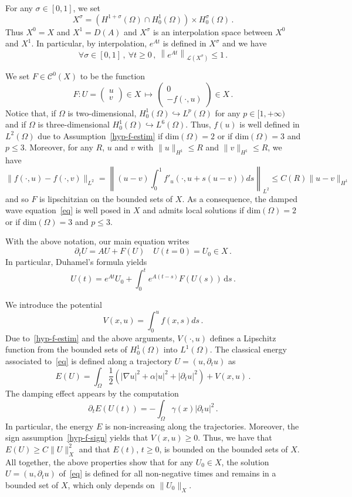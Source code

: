 \documentclass[10pt]{amsart}
\theoremstyle{definition}\newtheorem{defi}[theo]{Definition}\newtheorem{rema}[theo]{Remark}\newtheorem{exam}[theo]{Example}\newtheorem{exem}[theo]{Example}\newtheorem{nota}[theo]{Notation}
\newcommand{\Cc}{\mathcal{C}}
\newcommand{\Lc}{\mathcal{L}}
\newcommand{\drm}{\mathrm{d}}
\newcommand{\grad}{\nabla}
\newcommand{\vect}[2]{\left(
\begin{matrix} #1 \\ #2
\end{matrix}\right)}
\let\oldforall\forall
\renewcommand*{\forall}{\mathrel{\oldforall}}
\begin{document}
For any $\sigma\in [0,1]$, we set
\[
X^\sigma=\left(H^{1+\sigma}(\Omega)\cap H^1_0(\Omega)\right)\times
H^\sigma_0(\Omega)\,.
\]
Thus $X^0=X$ and $X^1=D(A)$ and $X^\sigma$ is an interpolation space between $X^0$ and $X^1$. In particular, by interpolation, $e^{At}$ is defined in $X^\sigma$ and we have
\begin{equation}\label{eq-bound-semigroup}
\forall \sigma\in [0,1]\,,\:\forall t\geq 0\,,\:
\left\|e^{At}\right\|_{\Lc(X^\sigma)}\leq 1\,.
\end{equation}

We set $F\in\Cc^0(X)$ to be the function
\begin{equation}\label{def-F}
F:U=\vect uv \in X\,\longmapsto\,\vect 0 {-f(\cdot,u)} \in X\,.
\end{equation}
Notice that, if $\Omega$ is two-dimensional, $H^1_0(\Omega) \hookrightarrow L^{p}(\Omega)$ for any $p\in[1,+\infty)$ and if $\Omega$ is three-dimensional $H^1_0(\Omega) \hookrightarrow L^6(\Omega)$. Thus, $f(u)$ is well defined in $L^2(\Omega)$ due to Assumption~\eqref{hyp-f-estim} if dim$(\Omega)=2$ or if dim$(\Omega)=3$ and $p\leq 3$. Moreover, for any $R$, $u$ and $v$ with $\|u\|_{H^1}\leq R$ and $\|v\|_{H^1}\leq R$, we have
\[
\|f(\cdot,u)-f(\cdot,v)\|_{L^2}=\left\|(u-v)\int_0^1
f'_u(\cdot,u+s(u-v))ds\right\|_{L^2}
\leq C(R)\|u-v\|_{H^1}
\]
and so $F$ is lipschitzian on the bounded sets of $X$. As a consequence, the damped wave equation~\eqref{eq} is well posed in $X$ and admits local solutions if dim$(\Omega)=2$ or if dim$(\Omega)=3$ and $p\leq 3$.

With the above notation, our main equation writes
\begin{equation}\label{eq2}
\partial_t U=AU + F(U)\quad U(t=0)=U_0\in X\,.
\end{equation}
In particular, Duhamel's formula yields
\[
U(t)=e^{At}U_0 + \int_0^t e^{A(t-s)}F(U(s))\,\drm s\,.
\]

We introduce the potential
\[
V(x,u)=\int_0^u f(x,s)ds\,.
\]
Due to~\eqref{hyp-f-estim} and the above arguments, $V(\cdot,u)$ defines a Lipschitz function from the bounded sets of $H^1_0(\Omega)$ into $L^1(\Omega)$. The classical energy associated to~\eqref{eq} is defined along a trajectory $U=(u,\partial_t u)$ as
\[
E(U)= \int_\Omega \frac12\left(|\grad u|^2+\alpha |u|^2+|\partial_t u|^2\right) +
V(x,u)\,.
\]
The damping effect appears by the computation
\begin{equation}\label{eq-deriv-E}
\partial_t E(U(t))= - \int_\Omega \gamma(x)|\partial_t u |^2\,.
\end{equation}
In particular, the energy $E$ is non-increasing along the trajectories. Moreover, the sign assumption~\eqref{hyp-f-sign} yields that $V(x,u)\geq 0$. Thus, we have that $E(U)\geq C \|U\|_X^2$ and that $E(t)$, $t\geq 0$, is bounded on the bounded sets of $X$. All together, the above properties show that for any $U_0\in X$, the solution $U=(u,\partial_t u)$ of~\eqref{eq} is defined for all non-negative times and remains in a bounded set of $X$, which only depends on $\|U_0\|_X$.
\end{document}
